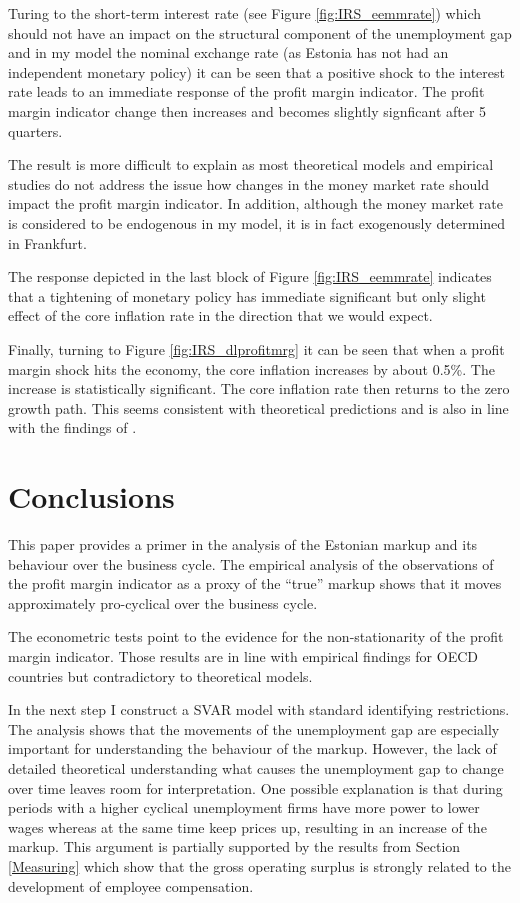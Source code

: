 \documentclass[twoside]{article}
\begin{document}
\begin{multicols}{2}
Turing to the short-term interest rate (see Figure \ref{fig:IRS_eemmrate}) which should not have an impact on the structural component of the unemployment gap and in my model the nominal exchange rate (as Estonia has not had an independent monetary policy) it can be seen that a positive shock to the interest rate leads to an immediate response of the profit margin indicator. The profit margin indicator change then increases and becomes slightly signficant after 5 quarters.

 The result is more difficult to explain as most theoretical models and empirical studies do not address the issue how changes in the money market rate should impact the profit margin indicator. In addition, although the money market rate is considered to be endogenous in my model, it is in fact exogenously determined in Frankfurt. 

The response depicted in the last block of Figure \ref{fig:IRS_eemmrate} indicates that a tightening of monetary policy has immediate significant but only slight effect of the core inflation rate in the direction that we would expect. 


Finally, turning to Figure \ref{fig:IRS_dlprofitmrg} it can be seen that when a profit margin shock hits the economy, the core inflation increases by about 0.5\%. The increase is statistically significant. The core inflation rate then returns to the zero growth path. This seems consistent with theoretical predictions and is also in line with the findings of \citet{Neiss2001Markup}. 



\section{Conclusions}
\label{Conclusions}

This paper provides a primer in the analysis of the Estonian markup and its behaviour over the business cycle. The empirical analysis of the observations of the profit margin indicator as a proxy of the ``true'' markup shows that it moves approximately pro-cyclical over the business cycle. 

The econometric tests point to the evidence for the non-stationarity of the profit margin indicator. Those results are in line with empirical findings for OECD countries \citep{Neiss2001Markup} but contradictory to theoretical models. 

In the next step I construct a SVAR model with standard identifying restrictions. The analysis shows that the movements of the unemployment gap are especially important for understanding the behaviour of the markup. However, the lack of detailed theoretical understanding what causes the unemployment gap to change over time leaves room for interpretation. One possible explanation is that during periods with a higher cyclical unemployment firms have more power to lower wages whereas at the same time keep prices up, resulting in an increase of the markup. This argument is partially supported by the results from Section \ref{Measuring} which show that the gross operating surplus is strongly related to the development of employee compensation. 


\end{multicols}
\end{document}
